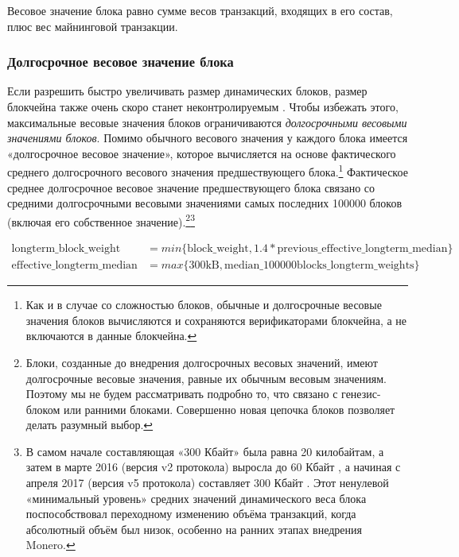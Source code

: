 Весовое значение блока равно сумме весов транзакций, входящих в его состав, плюс вес майнинговой транзакции.

\subsubsection*{Долгосрочное весовое значение блока}

Если разрешить быстро увеличивать размер динамических блоков, размер блокчейна также очень скоро станет неконтролируемым \cite{big-bang-github}. Чтобы избежать этого, максимальные весовые значения блоков ограничиваются {\em долгосрочными весовыми значениями блоков}. Помимо обыч\-ного весового значения у каждого блока имеется «долгосрочное весовое значение», которое вычисляется на основе фактического среднего долгосрочного весового значения предшес\-твующего блока.\footnote{Как и в случае со сложностью блоков, обычные и долгосрочные весовые значения блоков вычисляются и сохраняются верификаторами блокчейна, а не включаются в данные блокчейна.} Фактическое среднее долгосрочное весовое значение предшествующего блока связано со средними долгосрочными весовыми значениями самых последних 100000 блоков (включая его собственное значение).\footnote{Блоки, созданные до внедрения долгосрочных весовых значений, имеют долгосрочные весовые значения, равные их обычным весовым значениям. Поэтому мы не будем рассматривать подробно то, что связано с генезис-блоком или ранними блоками. Совершенно новая цепочка блоков позволяет делать разумный выбор.}\footnote{В самом начале составляющая «300 Кбайт» была равна 20 килобайтам, а затем в марте 2016 (версия v2 протокола) выросла до 60 Кбайт \cite{monero-0.9.3}, а начиная с апреля 2017 (версия v5 протокола) составляет 300 Кбайт \cite{monero-v5}. Этот ненулевой «минимальный уровень» средних значений динамического веса блока поспособствовал переходному изменению объёма транзакций, когда абсолютный объём был низок, особенно на ранних этапах внедрения Monero.}%

\begin{align*}
    \textrm{longterm\_block\_weight} &= min\{\textrm{block\_weight}, 1.4*\textrm{previous\_effective\_longterm\_median}\}\\
    \textrm{effective\_longterm\_median} &= max\{\textrm{300kB}, \textrm{median\_100000blocks\_longterm\_weights}\}%
\end{align*}{}

